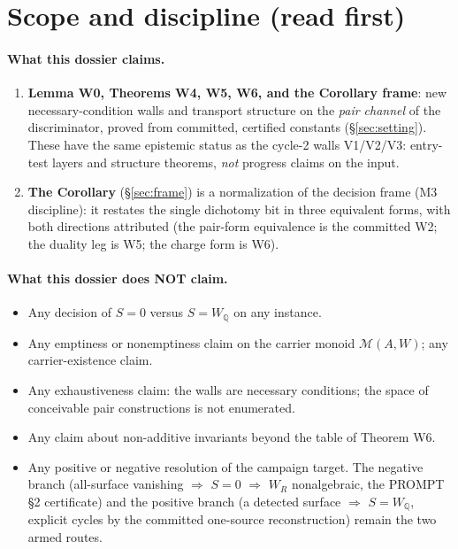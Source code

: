 \documentclass[11pt]{article}
\theoremstyle{definition}
\newcommand{\Q}{\mathbb{Q}}
\begin{document}
\tableofcontents

\section{Scope and discipline (read first)}\label{sec:scope}

\paragraph{What this dossier claims.}
\begin{enumerate}
\item \textbf{Lemma W0, Theorems W4, W5, W6, and the Corollary frame}: new
necessary-condition walls and transport structure on the \emph{pair channel}
of the discriminator, proved from committed, certified constants
(\S\ref{sec:setting}). These have the same epistemic status as the cycle-2
walls V1/V2/V3: entry-test layers and structure theorems, \emph{not} progress
claims on the input.
\item \textbf{The Corollary} (\S\ref{sec:frame}) is a normalization of the
decision frame (M3 discipline): it restates the single dichotomy bit in three
equivalent forms, with both directions attributed (the pair-form
equivalence is the committed W2; the duality leg is W5; the charge form is
W6).
\end{enumerate}

\paragraph{What this dossier does NOT claim.}
\begin{itemize}
\item Any decision of $S=0$ versus $S=W_\Q$ on any instance.
\item Any emptiness or nonemptiness claim on the carrier monoid
$\mathcal M(A,W)$; any carrier-existence claim.
\item Any exhaustiveness claim: the walls are necessary conditions; the space
of conceivable pair constructions is not enumerated.
\item Any claim about non-additive invariants beyond the table of Theorem W6.
\item Any positive or negative resolution of the campaign target. The
negative branch (all-surface vanishing $\Rightarrow$ $S=0$ $\Rightarrow$
$W_R$ nonalgebraic, the PROMPT \S2 certificate) and the positive branch (a
detected surface $\Rightarrow$ $S=W_\Q$, explicit cycles by the committed
one-source reconstruction) remain the two armed routes.
\end{itemize}
\end{document}
